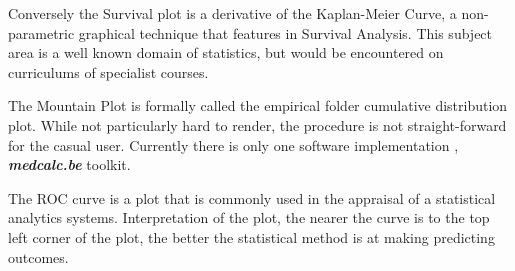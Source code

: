 \documentclass[MAIN.tex]{subfiles}
\begin{document}
Conversely the Survival plot is a derivative of the Kaplan-Meier Curve, a non-parametric graphical technique that features in Survival Analysis. This subject area is a well known domain of statistics, but would be encountered 
on curriculums of specialist courses. 

The Mountain Plot is formally called the empirical folder cumulative distribution plot. While not particularly hard to render, the procedure is not straight-forward for the casual user. Currently there is only one software implementation , \textbf{\textit{medcalc.be}} toolkit.





The ROC curve is a plot that is commonly used in the appraisal of a statistical analytics systems. Interpretation of the plot, the nearer the curve is to the
top left corner of the plot, the better the statistical method is at making predicting outcomes.




\end{document}
